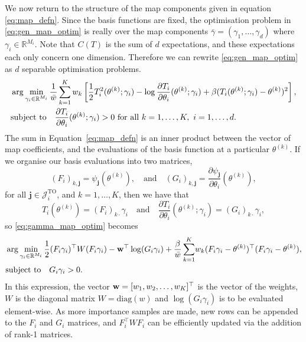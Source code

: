 \documentclass[final]{siamltex}
\begin{document}
We now return to the structure of the map components given in equation
\ref{eq:map_defn}. Since the basis functions are
fixed, the optimisation problem in \eqref{eq:gen_map_optim} is really over the map components $\bar{\gamma} = (\gamma_1, \dots,
\gamma_d)$ where $\gamma_i \in \mathbb{R}^{M_i}$. Note that $C(T)$ is the sum of $d$ expectations, and these expectations each only concern one dimension. Therefore we can rewrite \eqref{eq:gen_map_optim} as $d$ separable optimisation problems.
\begin{align}\label{eq:gamma_map_optim}
	&\arg\min_{\gamma_i\in\mathbb{R}^{M_i}} \frac{1}{\bar{w}}\sum\limits_{k=1}^K
		w_k \left[\frac{1}{2}T_i^2(\theta^{(k)}; \gamma_i) - \log\frac{\partial T_i}{\partial\theta_i}(\theta^{(k)}; \gamma_i) + \beta(T_i(\theta^{(k)};
		\gamma_i)-\theta^{(k)})^2\right], \\
	&\text{subject to} \quad \frac{\partial T_i}{\partial\theta_i}(\theta^{(k)};
		\gamma_i) > 0 \ \text{for all}\ k=1,\dots,K,\ i=1,\dots,d.
		\notag
\end{align}
The sum in Equation~\eqref{eq:map_defn} is an inner
product between the vector of map coefficients, and the evaluations of the basis function at a
particular $\theta^{(k)}$. If we organise our basis evaluations into two matrices,
\begin{equation}
	(F_i)_{k,\mathbf{j}} = \psi_\mathbf{j}(\theta^{(k)}), \quad \text{and} \quad (G_i)_{k,\mathbf{j}} =
\frac{\partial\psi_\mathbf{j}}{\partial\theta_i}(\theta^{(k)}),
\end{equation}
for all $\mathbf{j}
\in \mathcal{J}_i^\text{TO}$, and $k = 1,\dots,K$, then we have that
\begin{equation}
	T_i(\theta^{(k)}) = (F_i)_{k\cdot}\gamma_i \quad \text{and} \quad \frac{\partial T_i}{\partial \theta_i}(\theta^{(k)}; \gamma_i) = (G_i)_{k\cdot}\gamma_i,
\end{equation}
so \eqref{eq:gamma_map_optim} becomes
\begin{align}\label{eq:blas_map_optim}
	&\arg\min_{\gamma_i\in\mathbb{R}^{M_i}}
          \frac{1}{2}(F_i\gamma_i)^\top W (F_i\gamma_i) -
		{\bf w}^\top\log(G_i\gamma_i) + \frac{\beta}{\bar{w}}\sum\limits_{k=1}^K \!
		w_k(F_i\gamma_i-\theta^{(k)})^\top(F_i\gamma_i-\theta^{(k)}), \\
	&\text{subject to} \quad G_i\gamma_i > 0. \notag
\end{align}
In this expression, the vector ${\bf w} = [w_1, w_2, \ldots,
w_K]^\top$ is the vector of the weights, $W$ is the diagonal matrix $W
= \text{diag}(w)$ and $\log(G_i\gamma_i)$ is to be
evaluated element-wise. As more importance samples are made, new rows can be appended to the
$F_i$ and $G_i$ matrices, and $F_i^\top W F_i$ can be efficiently updated via the addition of rank-1 matrices.
\end{document}
